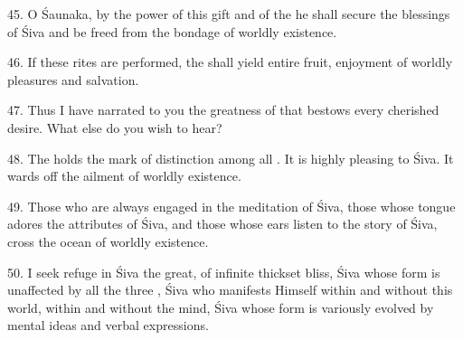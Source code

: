 45. O Śaunaka, by the power of this gift and of the  he shall secure
the blessings of Śiva and be freed from the bondage of worldly existence.

46. If these rites are performed, the  shall yield entire fruit,
enjoyment of worldly pleasures and salvation.

47. Thus I have narrated to you the greatness of  that bestows
every cherished desire. What else do you wish to hear?

48. The  holds the mark of distinction among all .
It is highly pleasing to Śiva. It wards off the ailment of worldly existence.

49. Those who are always engaged in the meditation of Śiva, those whose tongue
adores the attributes of Śiva, and those whose ears listen to the story of Śiva,
cross the ocean of worldly existence.

50. I seek refuge in Śiva the great, of infinite thickset bliss, Śiva whose form
is unaffected by all the three , Śiva who manifests Himself within and
without this world, within and without the mind, Śiva whose form is variously
evolved by mental ideas and verbal expressions.
\clearpage
